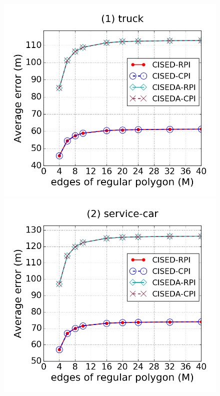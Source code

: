 \begin{figure}[tb!]
\centering
\includegraphics[scale = 0.250]{figures/Exp-M-e-200-error-truck.png}
\includegraphics[scale = 0.250]{figures/Exp-M-e-200-error-service.png}

\end{figure}
